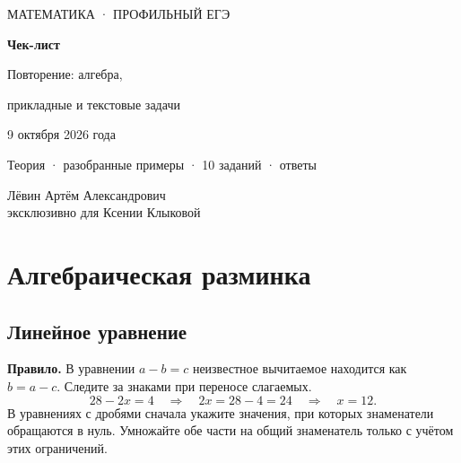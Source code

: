 \documentclass[a4paper,12pt]{article}
\newcommand{\key}[1]{\textbf{\color{darkaccent}#1}}
\begin{document}
\begin{titlepage}
  \thispagestyle{empty}
  \begin{center}
    \vspace*{26mm}
    {\color{accent}\Large МАТЕМАТИКА · ПРОФИЛЬНЫЙ ЕГЭ\par}
    \vspace{19mm}
    {\fontsize{31}{39}\selectfont\bfseries\color{darkaccent}Чек-лист\par}
    \vspace{10mm}
    {\fontsize{21}{27}\selectfont Повторение: алгебра,\par
      прикладные и текстовые задачи\par}
    \vspace{20mm}
    {\large 9 октября 2026 года\par}
    \vspace{6mm}
    {\normalsize Теория · разобранные примеры · 10 заданий · ответы\par}
    \vfill
    {\normalsize\color{darkaccent}Лёвин Артём Александрович\\[3pt]
      эксклюзивно для Ксении Клыковой\par}
    \vspace{28mm}
  \end{center}
\end{titlepage}

\section{Алгебраическая разминка}
\subsection{Линейное уравнение}
\key{Правило.} В уравнении $a-b=c$ неизвестное вычитаемое находится как $b=a-c$. Следите за знаками при переносе слагаемых.
\[
28-2x=4\quad\Longrightarrow\quad 2x=28-4=24\quad\Longrightarrow\quad\boxed{x=12}.
\]
В уравнениях с дробями сначала укажите значения, при которых знаменатели обращаются в нуль. Умножайте обе части на общий знаменатель только с учётом этих ограничений.
\end{document}
